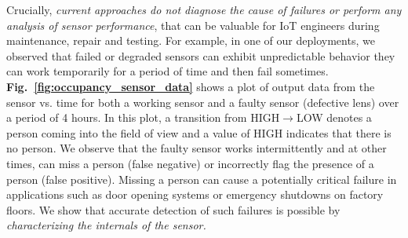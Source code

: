 Crucially, \textit{current approaches do not diagnose the cause of failures or perform any analysis of sensor performance}, that can be valuable for IoT %
engineers during maintenance, repair and testing. For example, in one of our deployments, we observed that failed or degraded sensors can exhibit unpredictable behavior \eg they can work temporarily for a period of time and then fail sometimes. {\bfseries  Fig.~\ref{fig:occupancy_sensor_data}} shows a plot of output data from the sensor vs. time for both a working sensor and a faulty sensor (defective lens) over a period of 4 hours.
In this plot, a transition from HIGH$\rightarrow$LOW denotes a person coming into the field of view %
and a value of HIGH indicates that there is no person. %
We observe that the faulty sensor works intermittently and at other times, can miss a person (false negative) or incorrectly flag the presence of a person (false positive).
%
%
Missing a person can cause a potentially critical failure in applications such as door opening systems or emergency shutdowns on factory floors.
%
We show that accurate detection of such failures is possible by \textit{characterizing the internals of the sensor.}
%
%


